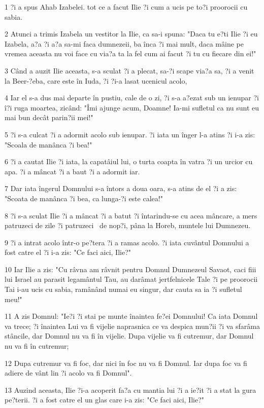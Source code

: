 \par 1 ?i a spus Ahab Izabelei. tot ce a facut Ilie ?i cum a ucis pe to?i proorocii cu sabia.
\par 2 Atunci a trimis Izabela un vestitor la Ilie, ca sa-i spuna: "Daca tu e?ti Ilie ?i eu Izabela, a?a ?i a?a sa-mi faca dumnezeii, ba înca ?i mai mult, daca mâine pe vremea aceasta nu voi face cu via?a ta la fel cum ai facut ?i tu cu fiecare din ei!"
\par 3 Când a auzit Ilie aceasta, s-a sculat ?i a plecat, sa-?i scape via?a sa, ?i a venit la Beer-?eba, care este în Iuda, ?i ?i-a lasat ucenicul acolo,
\par 4 Iar el s-a dus mai departe în pustiu, cale de o zi, ?i s-a a?ezat sub un ienupar ?i î?i ruga moartea, zicând: "Îmi ajunge acum, Doamne! Ia-mi sufletul ca nu sunt eu mai bun decât parin?ii mei!"
\par 5 ?i s-a culcat ?i a adormit acolo sub ienupar. ?i iata un înger l-a atins ?i i-a zis: "Scoala de manânca ?i bea!"
\par 6 ?i a cautat Ilie ?i iata, la capatâiul lui, o turta coapta în vatra ?i un urcior cu apa. ?i a mâncat ?i a baut ?i a adormit iar.
\par 7 Dar iata îngerul Domnului s-a întors a doua oara, s-a atins de el ?i a zis: "Scoata de manânca ?i bea, ca lunga-?i este calea!"
\par 8 ?i s-a sculat Ilie ?i a mâncat ?i a batut ?i întarindu-se cu acea mâncare, a mers patruzeci de zile ?i patruzeci  de nop?i, pâna la Horeb, muntele lui Dumnezeu.
\par 9 ?i a intrat acolo într-o pe?tera ?i a ramas acolo. ?i iata cuvântul Domnului a fost catre el ?i i-a zis: "Ce faci aici, Ilie?"
\par 10 Iar Ilie a zis: "Cu râvna am râvnit pentru Domnul Dumnezeul Savaot, caci fiii lui Israel au parasit legamântul Tau, au darâmat jertfelnicele Tale ?i pe proorocii Tai i-au ucis cu sabia, ramânând numai eu singur, dar cauta sa ia ?i sufletul meu!"
\par 11 A zis Domnul: "Ie?i ?i stai pe munte înaintea fe?ei Domnului! Ca iata Domnul va trece; ?i înaintea Lui va fi vijelie naprasnica ce va despica mun?ii ?i va sfarâma stâncile, dar Domnul nu va fi în vijelie. Dupa vijelie va fi cutremur, dar Domnul nu va fi în cutremur;
\par 12 Dupa cutremur va fi foc, dar nici în foc nu va fi Domnul. Iar dupa foc va fi adiere de vânt lin ?i acolo va fi Domnul".
\par 13 Auzind aceasta, Ilie ?i-a acoperit fa?a cu mantia lui ?i a ie?it ?i a stat la gura pe?terii. ?i a fost catre el un glas care i-a zis: "Ce faci aici, Ilie?"
